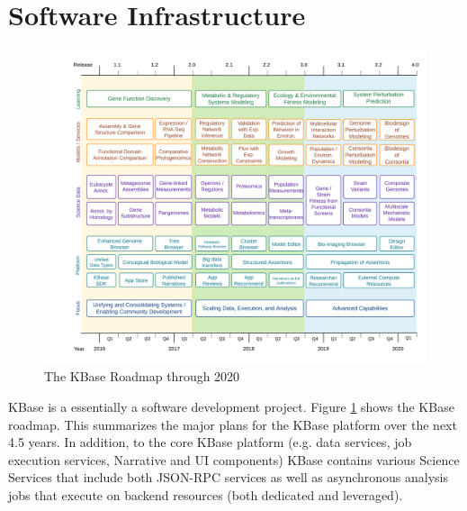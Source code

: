 \documentclass[10pt,a4paper]{report}
\begin{document}
\section{Software Infrastructure}
\begin{figure}[htbp]
\begin{center}
\includegraphics[width=5in]{kbase_roadmap.png}  
\caption{The KBase Roadmap through 2020}
\label{kbase:roadmap} 
\end{center}
\end{figure}

KBase is a essentially a software development project.  Figure \ref{kbase:roadmap} shows the KBase roadmap.  This summarizes the major plans for the KBase platform over the next 4.5 years.  In addition, to the core KBase platform (e.g. data services, job execution services, Narrative and UI components) KBase contains various Science Services that include both JSON-RPC services as well as asynchronous analysis jobs that execute on backend resources (both dedicated and leveraged).
\end{document}
